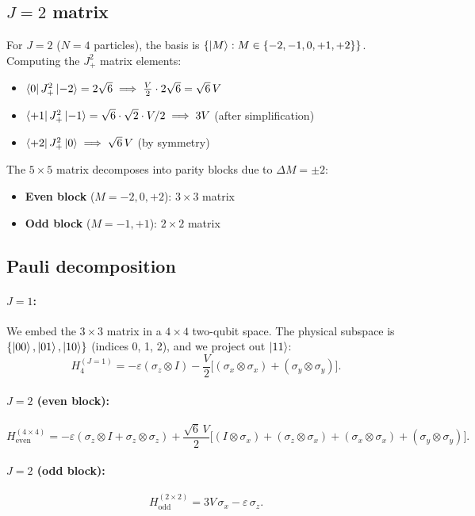 \documentclass[11pt]{article}
\begin{document}
\subsection{$J = 2$ matrix}

For $J = 2$ ($N = 4$ particles), the basis is $\{\ket{M} : M \in \{-2, -1, 0, +1, +2\}\}$. Computing the $J_+^2$ matrix elements:
\begin{itemize}[nosep]
  \item $\bra{0}J_+^2\ket{-2} = 2\sqrt{6} \implies \frac{V}{2} \cdot 2\sqrt{6} = \sqrt{6}\,V$
  \item $\bra{+1}J_+^2\ket{-1} = \sqrt{6}\cdot\sqrt{2}\cdot V/2 \implies 3V$ (after simplification)
  \item $\bra{+2}J_+^2\ket{0} \implies \sqrt{6}\,V$ (by symmetry)
\end{itemize}
The $5\times 5$ matrix decomposes into parity blocks due to $\Delta M = \pm 2$:
\begin{itemize}[nosep]
  \item \textbf{Even block} ($M = -2, 0, +2$): $3\times 3$ matrix
  \item \textbf{Odd block} ($M = -1, +1$): $2\times 2$ matrix
\end{itemize}

\subsection{Pauli decomposition}

\paragraph{$J = 1$:} We embed the $3 \times 3$ matrix in a $4 \times 4$ two-qubit space. The physical subspace is $\{\ket{00}, \ket{01}, \ket{10}\}$ (indices 0, 1, 2), and we project out $\ket{11}$:
\[
H_4^{(J=1)} = -\varepsilon(\sigma_z \otimes I) - \frac{V}{2}\bigl[(\sigma_x \otimes \sigma_x) + (\sigma_y \otimes \sigma_y)\bigr].
\]

\paragraph{$J = 2$ (even block):}
\[
H_\text{even}^{(4\times 4)} = -\varepsilon(\sigma_z \otimes I + \sigma_z \otimes \sigma_z) + \frac{\sqrt{6}\,V}{2}\bigl[(I\otimes\sigma_x) + (\sigma_z\otimes\sigma_x) + (\sigma_x\otimes\sigma_x) + (\sigma_y\otimes\sigma_y)\bigr].
\]

\paragraph{$J = 2$ (odd block):}
\[
H_\text{odd}^{(2\times 2)} = 3V\,\sigma_x - \varepsilon\,\sigma_z.
\]
\end{document}
